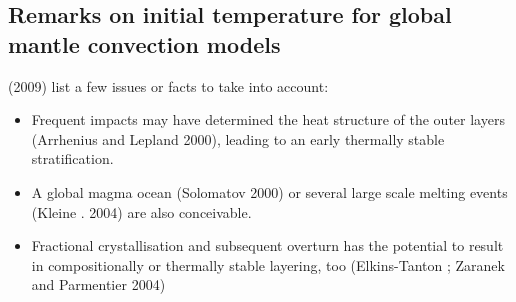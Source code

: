 


\subsection{Remarks on initial temperature for global mantle convection models}

\textcite{gows09} (2009) list a few issues or facts to take into account:
\begin{itemize}
\item Frequent  impacts  may  have  determined  the  heat structure of the outer 
layers (Arrhenius and Lepland 2000), leading to an early thermally stable stratification. 
\item A global magma ocean (Solomatov 2000)  or  several  large  scale  melting events  (Kleine \etal. 2004)  
are also conceivable. 
\item Fractional crystallisation and subsequent overturn has the potential to result in 
compositionally or thermally stable layering, too (Elkins-Tanton ; Zaranek and Parmentier 2004)
\end{itemize}











